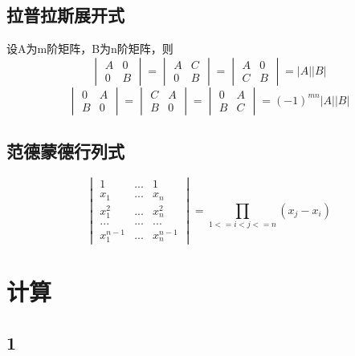 \subsection{拉普拉斯展开式}

设A为m阶矩阵，B为n阶矩阵，则
\[
\begin{vmatrix}
A & 0 \\
0 & B
\end{vmatrix} = 
\begin{vmatrix}
A & C \\
0 & B
\end{vmatrix} = 
\begin{vmatrix}
A & 0 \\
C & B
\end{vmatrix} = |A||B|
\]
\[
\begin{vmatrix}
0 & A \\
B & 0
\end{vmatrix} = 
\begin{vmatrix}
C & A \\
B & 0
\end{vmatrix} = 
\begin{vmatrix}
0 & A \\
B & C
\end{vmatrix} = (-1)^{mn}|A||B|
\]


\subsection{范德蒙德行列式}

\[
\begin{vmatrix}
1 & ... & 1 \\
x_1 & ... & x_n \\ 
x_1^2 & ... & x_n^2 \\ 
... & ... & ... \\ 
x_1^{n-1} & ... & x_n^{n-1}
\end{vmatrix} = \prod_{1<=i<j<=n}(x_j-x_i)
\]


\section{计算}

\subsection{1}

